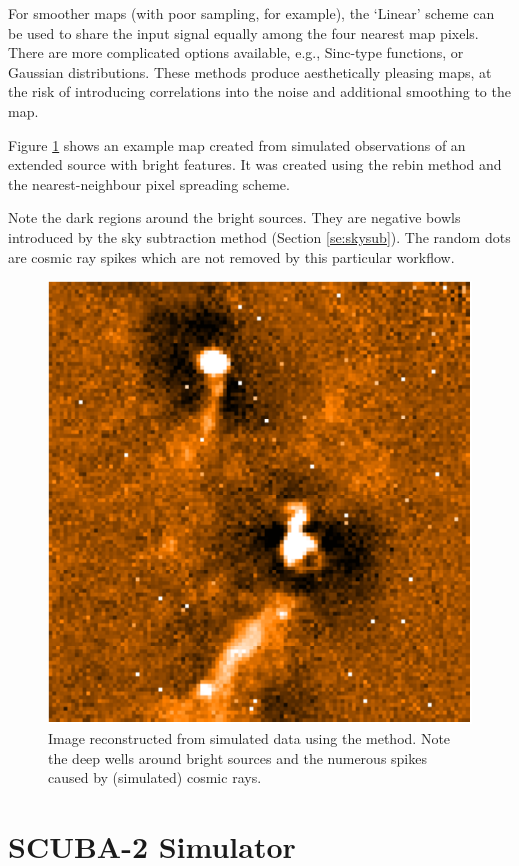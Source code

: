 \documentclass[oneside,11pt]{starlink}
\begin{document}
For smoother maps (with poor sampling, for example), the `Linear'
scheme can be used to share the input signal equally among the four
nearest map pixels. There are more complicated options available,
e.g., Sinc-type functions, or Gaussian distributions. These methods
produce aesthetically pleasing maps, at the risk of introducing
correlations into the noise and additional smoothing to the map.

Figure \ref{fig:rebinmap} shows an example map created from simulated
observations of an extended source with bright features. It was
created using the rebin method and the nearest-neighbour pixel
spreading scheme.

Note the dark regions around the bright sources. They are negative
bowls introduced by the sky subtraction method (Section
\ref{se:skysub}). The random dots are cosmic ray spikes which are not
removed by this particular workflow.

\begin{figure}[htb]
  \begin{center}
    \includegraphics[width=0.7\linewidth]{sun258_rebinmap}
    \caption{Image reconstructed from simulated data using the
       method. Note the deep wells around bright
      sources and the numerous spikes caused by (simulated) cosmic
      rays.}
    \label{fig:rebinmap}
  \end{center}
\end{figure}


\section{SCUBA-2 Simulator\label{se:sc2sim}}
\end{document}
